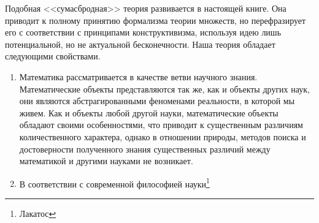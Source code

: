 Подобная <<сумасбродная>> теория развивается в настоящей книге. Она приводит к полному принятию формализма теории множеств, но перефразирует его с соответствии с принципами конструктивизма, используя идею лишь потенциальной, но не актуальной бесконечности. Наша теория обладает следующими свойствами.

\begin{enumerate}
\item Математика рассматривается в качестве ветви научного знания. Математические объекты представляются так же, как и объекты других наук, они являются абстрагированными феноменами реальности, в которой мы живем. Как и объекты любой другой науки, математические объекты обладают своими особенностями, что приводит к существенным различиям количественного характера, однако в отношении природы, методов поиска и достоверности полученного знания существенных различий между математикой и другими науками не возникает.
  \item В соответствии с современной философией науки\footnote{Лакатос}
\end{enumerate}
